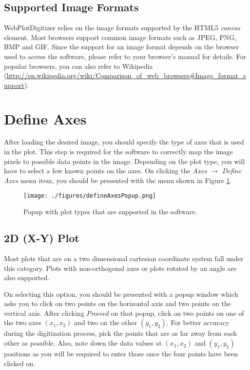 \documentclass[letterpaper, 10pt]{article}
\begin{document}
\subsection{Supported Image Formats}
WebPlotDigitizer relies on the image formats supported by the HTML5 \emph{canvas} element. Most browsers support common image formats such as JPEG, PNG, BMP and GIF. Since the support for an image format depends on the browser used to access the software, please refer to your browser's manual for details. For popular browsers, you can also refer to Wikipedia (\url{http://en.wikipedia.org/wiki/Comparison_of_web_browsers#Image_format_support}).


\section{Define Axes}

After loading the desired image, you should specify the type of axes that is used in the plot. This step is required for the software to correctly map the image pixels to possible data points in the image. Depending on the plot type, you will have to select a few known points on the axes. On clicking the \emph{Axes $\rightarrow$ Define Axes} menu item, you should be presented with the menu shown in Figure \ref{fig:defineAxesPopup}.
\begin{figure}
\begin{center}
\texttt{[image: ./figures/defineAxesPopup.png]}
\caption{Popup with plot types that are supported in the software.}
\label{fig:defineAxesPopup}
\end{center}
\end{figure}

\subsection{2D (X-Y) Plot}
Most plots that are on a two dimensional cartesian coordinate system fall under this category. Plots with non-orthogonal axes or plots rotated by an angle are also supported.

On selecting this option, you should be presented with a popup window which asks you to click on two points on the horizontal axis and two points on the vertical axis. After clicking \emph{Proceed} on that popup, click on two points on one of the two axes $(x_1, x_2)$ and two on the other $(y_1, y_2)$. For better accuracy during the digitization process, pick the points that are as far away from each other as possible. Also, note down the data values at $(x_1, x_2)$ and $(y_1, y_2)$ positions as you will be required to enter those once the four points have been clicked on. 
\end{document}
